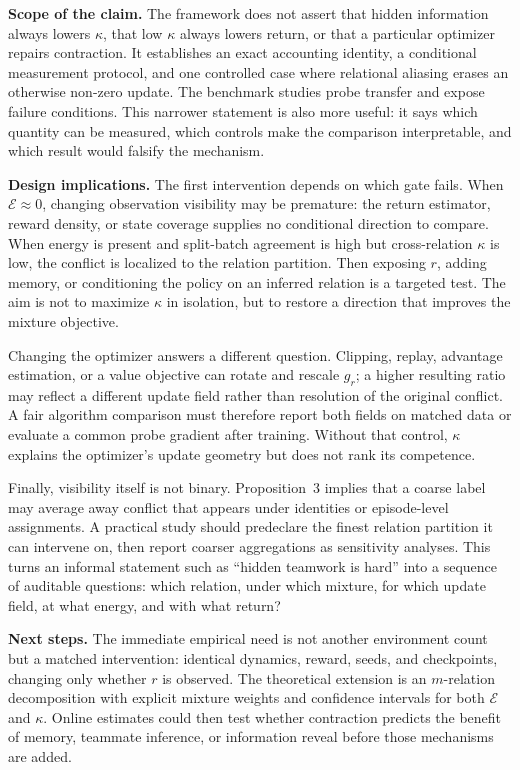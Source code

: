 \documentclass[letterpaper]{article}
\begin{document}
\textbf{Scope of the claim.}
The framework does not assert that hidden information always lowers $\kappa$, that low $\kappa$ always lowers return, or that a particular optimizer repairs contraction.
It establishes an exact accounting identity, a conditional measurement protocol, and one controlled case where relational aliasing erases an otherwise non-zero update.
The benchmark studies probe transfer and expose failure conditions.
This narrower statement is also more useful: it says which quantity can be measured, which controls make the comparison interpretable, and which result would falsify the mechanism.

\textbf{Design implications.}
The first intervention depends on which gate fails.
When $\mathcal{E}\approx0$, changing observation visibility may be premature: the return estimator, reward density, or state coverage supplies no conditional direction to compare.
When energy is present and split-batch agreement is high but cross-relation $\kappa$ is low, the conflict is localized to the relation partition.
Then exposing $r$, adding memory, or conditioning the policy on an inferred relation is a targeted test.
The aim is not to maximize $\kappa$ in isolation, but to restore a direction that improves the mixture objective.

Changing the optimizer answers a different question.
Clipping, replay, advantage estimation, or a value objective can rotate and rescale $g_r$; a higher resulting ratio may reflect a different update field rather than resolution of the original conflict.
A fair algorithm comparison must therefore report both fields on matched data or evaluate a common probe gradient after training.
Without that control, $\kappa$ explains the optimizer's update geometry but does not rank its competence.

Finally, visibility itself is not binary.
Proposition~3 implies that a coarse label may average away conflict that appears under identities or episode-level assignments.
A practical study should predeclare the finest relation partition it can intervene on, then report coarser aggregations as sensitivity analyses.
This turns an informal statement such as ``hidden teamwork is hard'' into a sequence of auditable questions: which relation, under which mixture, for which update field, at what energy, and with what return?

\textbf{Next steps.}
The immediate empirical need is not another environment count but a matched intervention: identical dynamics, reward, seeds, and checkpoints, changing only whether $r$ is observed.
The theoretical extension is an $m$-relation decomposition with explicit mixture weights and confidence intervals for both $\mathcal{E}$ and $\kappa$.
Online estimates could then test whether contraction predicts the benefit of memory, teammate inference, or information reveal before those mechanisms are added.
\end{document}

